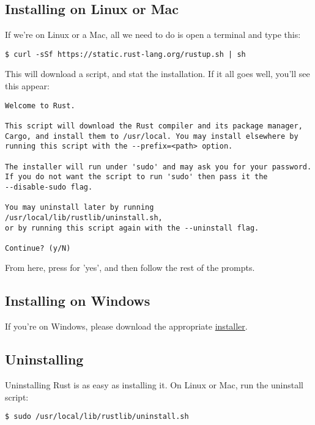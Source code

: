 \subsection*{Installing on Linux or Mac}

If we're on Linux or a Mac, all we need to do is open a terminal and type this:

\begin{verbatim}
$ curl -sSf https://static.rust-lang.org/rustup.sh | sh
\end{verbatim}

This will download a script, and stat the installation. If it all goes well, you'll see this appear:

\begin{verbatim}
Welcome to Rust.

This script will download the Rust compiler and its package manager, 
Cargo, and install them to /usr/local. You may install elsewhere by 
running this script with the --prefix=<path> option.

The installer will run under 'sudo' and may ask you for your password. 
If you do not want the script to run 'sudo' then pass it the 
--disable-sudo flag.

You may uninstall later by running /usr/local/lib/rustlib/uninstall.sh,
or by running this script again with the --uninstall flag.

Continue? (y/N)
\end{verbatim}

From here, press  for 'yes', and then follow the rest of the prompts.

\subsection*{Installing on Windows}

If you're on Windows, please download the appropriate \href{https://www.rust-lang.org/install.html}{installer}.

\subsection*{Uninstalling}

Uninstalling Rust is as easy as installing it. On Linux or Mac, run the uninstall script:

\begin{verbatim}
$ sudo /usr/local/lib/rustlib/uninstall.sh
\end{verbatim}

